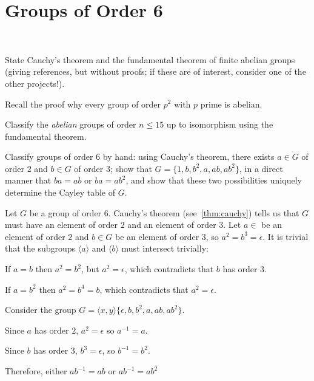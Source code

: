 \section{Groups of Order 6}~\label{sec:groups-order-6}

\begin{Answer}
  \begin{enumalph}
    \item State Cauchy's theorem and the fundamental theorem of finite abelian groups 
      (giving references, but without proofs; if these are of interest, consider one of 
      the other projects!).  
    \item Recall the proof why every group of order $p^2$ with $p$ prime is abelian.  
    \item Classify the \emph{abelian} groups of order $n \leq 15$ up to isomorphism 
    using the fundamental theorem.
    \item Classify groups of order $6$ by hand: using Cauchy's theorem, there exists $a
    \in G$ of order $2$ and $b \in G$ of order $3$;
      show that $G=\{1,b,b^2,a,ab,ab^2\}$, in a direct manner that
      $ba=ab$ or $ba=ab^2$, and show that these two possibilities uniquely determine
      the Cayley table of $G$.
  \end{enumalph}
\end{Answer}

Let $G$ be a group of order $6$.
Cauchy's theorem (see~\ref{thm:cauchy}) tells us that $G$ must have
an element of order $2$ and an element of order $3$.
Let $a \in$ be an element of order $2$ and $b \in G$ be an element of order $3$,
so $a^2 = b^3 = \epsilon$.
It is trivial that the subgroups $\langle a \rangle$ and $\langle b \rangle$
must intersect trivially:
\begin{enumalph}
  \item If $a = b$ then $a^2 = b^2$, but $a^2 = \epsilon$, which contradicts that $b$ has order $3$.
  \item If $a = b^2$ then $a^2 = b^4 = b$, which contradicts that $a^2 = \epsilon$.
\end{enumalph}
Consider the group $G = \langle x, y \rangle  \{ \epsilon, b, b^2, a, ab, ab^2 \}$.
\begin{enumalph}
  \item Since $a$ has order $2$, $a^2 = \epsilon$ so $a^{-1} = a$.
  \item Since $b$ has order $3$, $b^3 = \epsilon$, so $b^{-1} = b^2$.
  \item Therefore, either ${ab}^{-1} = ab$ or ${ab}^{-1} = ab^2$
\end{enumalph}

